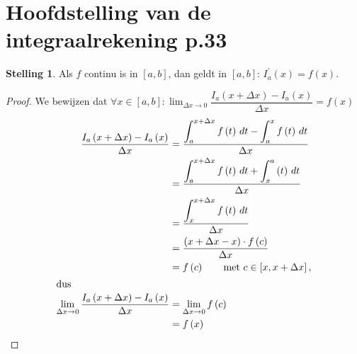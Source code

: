 \documentclass{article}
\theoremstyle{definition}
\newtheorem*{Stelling}{Stelling}
\begin{document}
\section{Hoofdstelling van de integraalrekening p.33}
\begin{Stelling}
  Als $f$ continu is in $\left[a,b\right]$, dan geldt in $\left[a,b\right]$: $I_a^{'} \left(x\right) = f\left(x\right)$.
\end{Stelling}
\begin{proof}
  We bewijzen dat $\forall x \in \left[a,b\right]: \displaystyle\lim_{\Delta x \to 0} \dfrac{I_a\left(x+\Delta x\right) - I_a\left(x\right)}{\Delta x} = f\left(x\right)$
\begin{align*}
  \dfrac{I_a\left(x+\Delta x\right) - I_a\left(x\right)}{\Delta x} &= \frac{\displaystyle\int_{a}^{x+\Delta x}f\left(t\right)\, dt - \displaystyle\int_{a}^{x}f\left(t\right)\, dt}{\Delta x}\\
                                                                                         &= \frac{\displaystyle\int_{a}^{x+\Delta x}f\left(t\right)\, dt + \displaystyle\int_{x}^{a}\left(t\right)\, dt}{\Delta x}\\
                                                                                         &= \frac{\displaystyle\int_{x}^{x+\Delta x}f\left(t\right)\, dt}{\Delta x}\\
                                                                                         &=\frac{\left(x+\Delta x -x\right)\cdot f\left(c\right)}{\Delta x}\\
                                                                                         &=f\left(c\right) \qquad \text{met } c\in \left[x, x+\Delta x\right],\\
                                                                                         \intertext{dus}
  \displaystyle\lim_{\Delta x \to 0} \dfrac{I_a\left(x+\Delta x\right) - I_a\left(x\right)}{\Delta x} &= \lim_{\Delta x \to 0} f\left(c\right)\\
                                                                                                      &=f\left(x\right)
\end{align*}
\end{proof}
\end{document}
